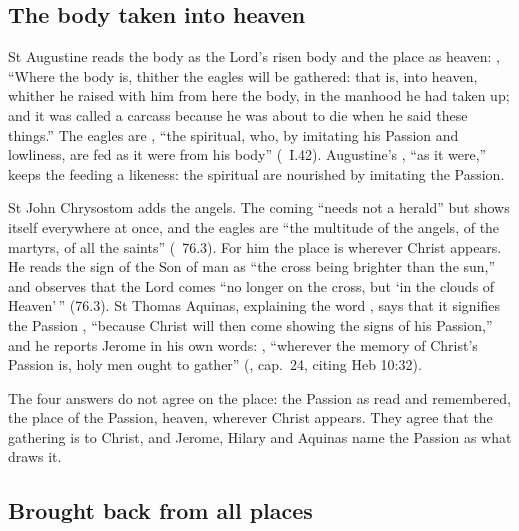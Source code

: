 \subsection{The body taken into heaven}
\label{sec:body-augustine}

St Augustine reads the body as the Lord's risen body and the place as heaven:
, ``Where the body is, thither
the eagles will be gathered: that is, into heaven, whither he raised with him
from here the body, in the manhood he had taken up; and it was called a
carcass because he was about to die when he said these things.'' The eagles
are , ``the spiritual, who, by imitating his Passion and
lowliness, are fed as it were from his body'' (~I.42). Augustine's , ``as it were,'' keeps the
feeding a likeness: the spiritual are nourished by imitating the Passion.

St John Chrysostom adds the angels. The coming ``needs not a herald'' but shows
itself everywhere at once, and the eagles are ``the multitude of the angels, of
the martyrs, of all the saints'' (~76.3). For him the place
is wherever Christ appears. He reads the sign of the Son of man as ``the cross
being brighter than the sun,'' and observes that the Lord comes ``no longer on
the cross, but `in the clouds of Heaven'\,'' (76.3). St Thomas Aquinas, explaining the
word , says that it signifies the Passion , ``because Christ will then come
showing the signs of his Passion,'' and he reports Jerome in his own words:
,
``wherever the memory of Christ's Passion is, holy men ought to gather''
(, cap.~24, citing Heb 10:32).

The four answers do not agree on the place: the Passion as read and
remembered, the place of the Passion, heaven, wherever Christ appears. They
agree that the gathering is to Christ, and Jerome, Hilary and Aquinas name the
Passion as what draws it.

\subsection{Brought back from all places}
\label{sec:body-introit}

